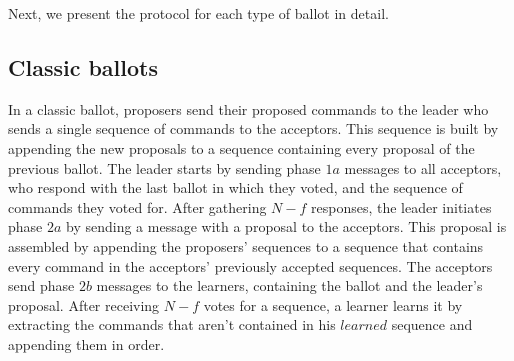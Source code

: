Next, we present the protocol for each type of ballot in detail.

\subsection{Classic ballots} 

In a classic ballot, proposers send their proposed commands to the leader who sends a single sequence of commands to the acceptors. This sequence is built by appending the new proposals to a sequence containing every proposal of the previous ballot. The leader starts by sending phase $1a$ messages to all acceptors, who respond with the last ballot in which they voted, and the sequence of commands they voted for. After gathering $N-f$ responses, the leader initiates phase $2a$ by sending a message with a proposal to the acceptors. This proposal is assembled by appending the proposers' sequences to a sequence that contains every command in the acceptors' previously accepted sequences. The acceptors send phase $2b$ messages to the learners, containing the ballot and the leader's proposal. After receiving $N-f$ votes for a sequence, a learner learns it by extracting the commands that aren't contained in his $learned$ sequence and appending them in order.

